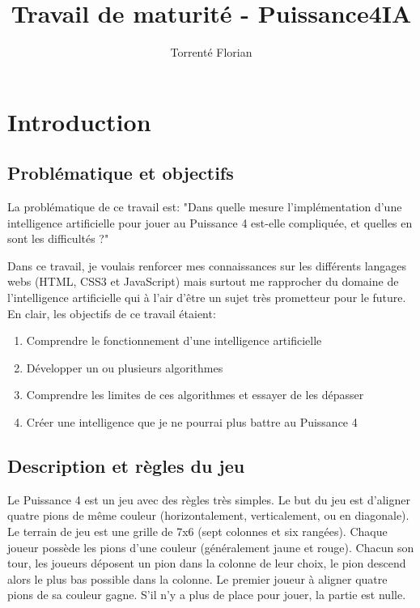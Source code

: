\documentclass[a4paper]{article}
\author{Torrenté Florian}
\title{Travail de maturité - Puissance4IA}
\begin{document}
\maketitle

\tableofcontents

\newpage
\section{Introduction}

\subsection{Problématique et objectifs}
    La problématique de ce travail est: "Dans quelle mesure l'implémentation d'une intelligence artificielle pour jouer au Puissance 4 est-elle compliquée, et quelles en sont les difficultés ?"

    Dans ce travail, je voulais renforcer mes connaissances sur les différents langages webs (HTML, CSS3 et JavaScript) mais surtout me rapprocher du domaine de l'intelligence artificielle qui à l'air d'être un sujet très prometteur pour le future. En clair, les objectifs de ce travail étaient:
    \begin{enumerate}
        \item Comprendre le fonctionnement d'une intelligence artificielle
        \item Développer un ou plusieurs algorithmes
        \item Comprendre les limites de ces algorithmes et essayer de les dépasser
        \item Créer une intelligence que je ne pourrai plus battre au Puissance 4
    \end{enumerate}

\subsection{Description et règles du jeu}
    Le Puissance 4 est un jeu avec des règles très simples. Le but du jeu est d'aligner quatre pions de même couleur (horizontalement, verticalement, ou en diagonale). Le terrain de jeu est une grille de 7x6 (sept colonnes et six rangées). Chaque joueur possède les pions d'une couleur (généralement jaune et rouge). Chacun son tour, les joueurs déposent un pion dans la colonne de leur choix, le pion descend alors le plus bas possible dans la colonne. Le premier joueur à aligner quatre pions de sa couleur gagne. S'il n'y a plus de place pour jouer, la partie est nulle.
\end{document}
